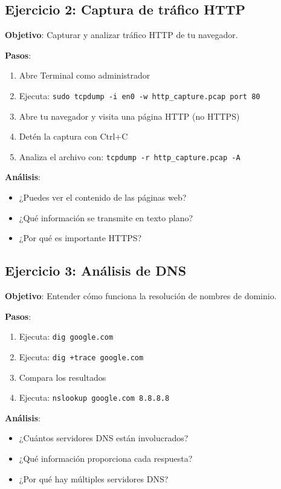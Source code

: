\begin{itemize}
\subsection{Ejercicio 2: Captura de tráfico HTTP}

\textbf{Objetivo}: Capturar y analizar tráfico HTTP de tu navegador.

\textbf{Pasos}:
\begin{enumerate}
    \item Abre Terminal como administrador
    \item Ejecuta: \texttt{sudo tcpdump -i en0 -w http\_capture.pcap port 80}
    \item Abre tu navegador y visita una página HTTP (no HTTPS)
    \item Detén la captura con Ctrl+C
    \item Analiza el archivo con: \texttt{tcpdump -r http\_capture.pcap -A}
\end{enumerate}

\textbf{Análisis}:
\begin{itemize}
    \item ¿Puedes ver el contenido de las páginas web?
    \item ¿Qué información se transmite en texto plano?
    \item ¿Por qué es importante HTTPS?
\end{itemize}

\subsection{Ejercicio 3: Análisis de DNS}

\textbf{Objetivo}: Entender cómo funciona la resolución de nombres de dominio.

\textbf{Pasos}:
\begin{enumerate}
    \item Ejecuta: \texttt{dig google.com}
    \item Ejecuta: \texttt{dig +trace google.com}
    \item Compara los resultados
    \item Ejecuta: \texttt{nslookup google.com 8.8.8.8}
\end{enumerate}

\textbf{Análisis}:
\begin{itemize}
    \item ¿Cuántos servidores DNS están involucrados?
    \item ¿Qué información proporciona cada respuesta?
    \item ¿Por qué hay múltiples servidores DNS?
\end{itemize}


\end{itemize}

